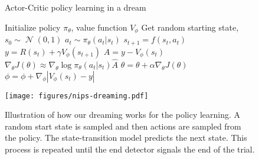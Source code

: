 \documentclass[letterpaper, 10 pt, conference]{ieeeconf}
\DeclareMathOperator{\N}{\mathcal{N}}
\begin{document}
\begin{figure*}
\centering
\begin{minipage}{0.55\textwidth}
\begin{algorithm}[H]
  \caption{Actor-Critic policy learning in a dream
    \label{alg:policy-learning}}  
  \begin{algorithmic}  
    \State Initialize policy $\pi_\theta$, value function $V_\phi$
    \State Get random starting state, $s_0 \sim \N(0,1)$
        \State $a_t \sim \pi_\theta(a_t|s_t)$
        \State $s_{t+1} = f(s_t, a_t)$
        \State $y = R(s_t) + \gamma V_\phi(s_{t+1})$
        \State $\hat{A} = y - V_\phi(s_t)$
        \State $\nabla_\theta J(\theta) \approx \nabla_\theta \log \pi_\theta (a_t|s_t) \hat{A}$
        \State $\theta = \theta + \alpha\nabla_\theta J(\theta)$
        \State $\phi = \phi + \nabla_\phi |V_\phi(s_t) - y|$
    \EndFor
    \EndFor
    \EndFunction
  \end{algorithmic}  
\end{algorithm}
\end{minipage}
\hfill
\begin{minipage}{0.43\textwidth}
\centering
\texttt{[image: figures/nips-dreaming.pdf]}
\caption{Illustration of how our dreaming works for the policy learning. A random start state is sampled and then actions are sampled from the policy. The state-transition model predicts the next state. This process is repeated until the end detector signals the end of the trial.}
\label{fig:test}
\end{minipage}
\end{figure*}
\end{document}
